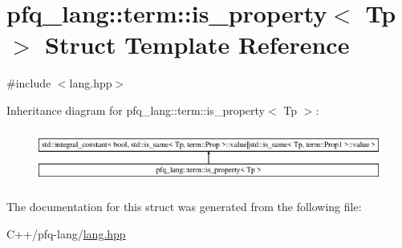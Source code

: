 \hypertarget{structpfq__lang_1_1term_1_1is__property}{\section{pfq\-\_\-lang\-:\-:term\-:\-:is\-\_\-property$<$ Tp $>$ Struct Template Reference}
\label{structpfq__lang_1_1term_1_1is__property}
}


{\ttfamily \#include $<$lang.\-hpp$>$}

Inheritance diagram for pfq\-\_\-lang\-:\-:term\-:\-:is\-\_\-property$<$ Tp $>$\-:\begin{figure}[H]
\begin{center}
\leavevmode
\includegraphics[height=1.794872cm]{structpfq__lang_1_1term_1_1is__property}
\end{center}
\end{figure}


The documentation for this struct was generated from the following file\-:\begin{DoxyCompactItemize}
\item 
C++/pfq-\/lang/\hyperlink{lang_8hpp}{lang.\-hpp}\end{DoxyCompactItemize}
